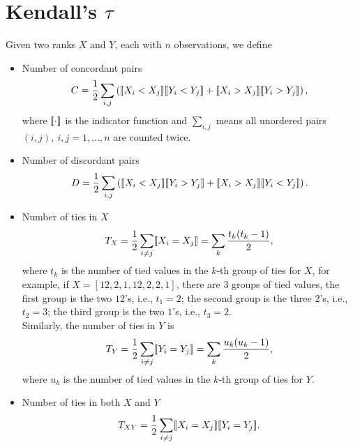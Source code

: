 \section{Kendall's $\tau$}
\label{sec:kendalltau}

Given two ranks $X$ and $Y$, each with $n$ observations, we define
\begin{itemize}
\item Number of concordant pairs 
      \begin{equation*}
      C = \frac{1}{2} \sum_{i,j} \left( \llbracket X_i < X_j \rrbracket  \llbracket Y_i < Y_j \rrbracket + \llbracket X_i > X_j \rrbracket  \llbracket Y_i > Y_j \rrbracket \right),
      \end{equation*}
      where $\llbracket \cdot \rrbracket$ is the indicator function and 
      $\sum_{i,j}$ means all unordered pairs $(i, j),~ i,j=1,\dots,n$ are counted twice.

\item Number of discordant pairs 
      \begin{equation*}
      D = \frac{1}{2} \sum_{i,j} \left( \llbracket X_i < X_j \rrbracket  \llbracket Y_i > Y_j \rrbracket + \llbracket X_i > X_j \rrbracket  \llbracket Y_i < Y_j \rrbracket \right).
      \end{equation*}

\item Number of ties in $X$
      \begin{equation*}
      T_X = \frac{1}{2} \sum_{i \ne j} \llbracket X_i = X_j \rrbracket = \sum_k \frac{t_k (t_k - 1)}{2},
      \end{equation*}
      where $t_k$ is the number of tied values in the $k$-th group of ties for $X$, for example, if
      $X = [12, 2, 1, 12, 2, 2, 1]$, there are $3$ groups of tied values, the first group is the two $12$'s, i.e., $t_1 = 2$;
      the second group is the three $2$'s, i.e., $t_2 = 3$; the third group is the two $1$'s, i.e., $t_3 = 2$. \\
      Similarly, the number of ties in $Y$ is 
      \begin{equation*}
      T_Y = \frac{1}{2} \sum_{i \ne j} \llbracket Y_i = Y_j \rrbracket = \sum_k \frac{u_k (u_k - 1)}{2},
      \end{equation*}
      where $u_k$ is the number of tied values in the $k$-th group of ties for $Y$.

\item Number of ties in both $X$ and $Y$
      \begin{equation*}
      T_{XY} = \frac{1}{2} \sum_{i \ne j} \llbracket X_i = X_j \rrbracket  \llbracket Y_i = Y_j \rrbracket.
      \end{equation*}


\end{itemize}
